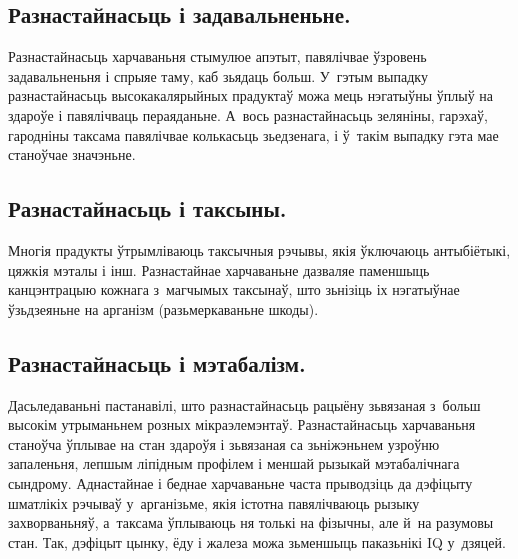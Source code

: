 \subsection{Разнастайнасьць і задавальненьне.}
Разнастайнасьць харчаваньня стымулюе апэтыт, павялічвае ўзровень задавальненьня і спрыяе таму, каб зьядаць больш. У~гэтым выпадку разнастайнасьць высокакалярыйных прадуктаў можа мець нэгатыўны ўплыў на здароўе і павялічваць пераяданьне. А~вось разнастайнасьць зеляніны, гарэхаў, гародніны таксама павялічвае колькасьць зьедзенага, і ў~такім выпадку гэта мае станоўчае значэньне.

\subsection{Разнастайнасьць і таксыны.}
Многія прадукты ўтрымліваюць таксычныя рэчывы, якія ўключаюць антыбіётыкі, цяжкія мэталы і інш. Разнастайнае харчаваньне дазваляе паменшыць канцэнтрацыю кожнага з~магчымых таксынаў, што зьнізіць іх нэгатыўнае ўзьдзеяньне на арганізм (разьмеркаваньне шкоды).


\subsection{Разнастайнасьць і мэтабалізм.}
Дасьледаваньні пастанавілі, што разнастайнасьць рацыёну зьвязаная з~больш высокім утрыманьнем розных мікраэлемэнтаў. Разнастайнасьць харчаваньня станоўча ўплывае на стан здароўя і зьвязаная са зьніжэньнем узроўню запаленьня, лепшым ліпідным профілем і меншай рызыкай мэтабалічнага сындрому. Аднастайнае і беднае харчаваньне часта прыводзіць да дэфіцыту шматлікіх рэчываў у~арганізьме, якія істотна павялічваюць рызыку захворваньняў, а~таксама ўплываюць ня толькі на фізычны, але й~на разумовы стан. Так, дэфіцыт цынку, ёду і жалеза можа зьменшыць паказьнікі IQ у~дзяцей.


